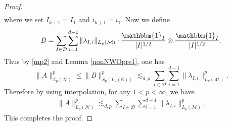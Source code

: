 \documentclass[oneside,english,a4wide]{amsart}
\numberwithin{equation}{section}
\numberwithin{figure}{section}
\theoremstyle{plain}
\theoremstyle{plain}
\theoremstyle{definition}
\theoremstyle{plain}
\theoremstyle{remark}
\theoremstyle{definition}
\theoremstyle{remark}
\theoremstyle{definition}
\newcommand{\8}{\infty}
\begin{document}
\begin{proof}
\begin{equation}
\begin{aligned}
		\end{aligned}
	\end{equation}
	where we set $I_{k+1}=I_1$ and $i_{k+1}=i_1$. Now we define
	\begin{equation*}
		B=\sum_{I\in \mathcal{D}}\sum_{i=1}^{d-1}\|\lambda_{I,i}\|_{L_{p}(\mathcal{M})}\cdot \frac{\mathbbm{1}_I}{|I|^{1/2}}\otimes \frac{\mathbbm{1}_I}{|I|^{1/2}}.
	\end{equation*}
	Thus by \eqref{mp2} and Lemma \ref{nonNWOpre1}, one has
	\begin{equation}\label{BlambdaI}
		\|A\|^p_{L_p(\mathcal{N})}\leq \|B\|^p_{S_p(L_2(\mathbb{R}))}\lesssim_{d,p} \sum_{I\in\mathcal{D}}\sum_{i=1}^{d-1}\|\lambda_{I,i}\|^p_{L_p(\mathcal{M})}.
	\end{equation}
		Therefore by using interpolation, for any $1< p<\infty$, we have
		\begin{equation*}
			\begin{aligned}
				\|A\|^p_{L_p(\mathcal{N})}\lesssim_{d,p}	\sum_{I\in\mathcal{D}}\sum_{i=1}^{d-1}\|\lambda_{I,i}\|^p_{L_p(\mathcal{M})}.
			\end{aligned}
		\end{equation*}
		This completes the proof.
	\end{proof}
	
\end{document}
